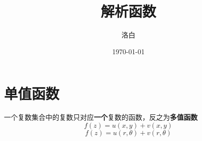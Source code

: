 \documentclass{article}
\title{解析函数}
\author{洛白}
\date{\today}
\begin{document}
\maketitle
\newpage

\renewcommand{\baselinestretch}{1.35}
\tableofcontents
\newpage

\setlength{\parskip}{0em}
\renewcommand{\baselinestretch}{1.53}
\section{单值函数}
一个复数集合中的复数只对应\textbf{一个}复数的函数，反之为\textbf{多值函数}
\[f(z)=u(x,y)+v(x,y) \]
$$f(z)=u(r,\theta)+v(r,\theta)$$
\end{document}
